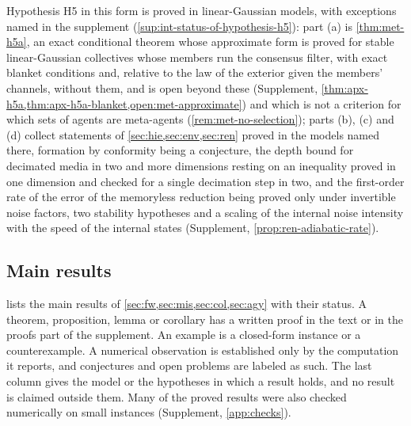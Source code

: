 Hypothesis H5 in this form is proved in linear-Gaussian models, with exceptions named in the supplement (\cref{sup:int-status-of-hypothesis-h5}): part (a) is \cref{thm:met-h5a}, an exact conditional theorem whose approximate form is proved for stable linear-Gaussian collectives whose members run the consensus filter, with exact blanket conditions and, relative to the law of the exterior given the members' channels, without them, and is open beyond these (Supplement, \cref{thm:apx-h5a,thm:apx-h5a-blanket,open:met-approximate}) and which is not a criterion for which sets of agents are meta-agents (\cref{rem:met-no-selection}); parts (b), (c) and (d) collect statements of \cref{sec:hie,sec:env,sec:ren} proved in the models named there, formation by conformity being a conjecture, the depth bound for decimated media in two and more dimensions resting on an inequality proved in one dimension and checked for a single decimation step in two, and the first-order rate of the error of the memoryless reduction being proved only under invertible noise factors, two stability hypotheses and a scaling of the internal noise intensity with the speed of the internal states (Supplement, \cref{prop:ren-adiabatic-rate}).

\subsection{Main results}\label{sec:int-results}

 lists the main results of \cref{sec:fw,sec:mis,sec:col,sec:agy} with their status. A theorem, proposition, lemma or corollary has a written proof in the text or in the proofs part of the supplement. An example is a closed-form instance or a counterexample. A numerical observation is established only by the computation it reports, and conjectures and open problems are labeled as such. The last column gives the model or the hypotheses in which a result holds, and no result is claimed outside them. Many of the proved results were also checked numerically on small instances (Supplement, \cref{app:checks}).


